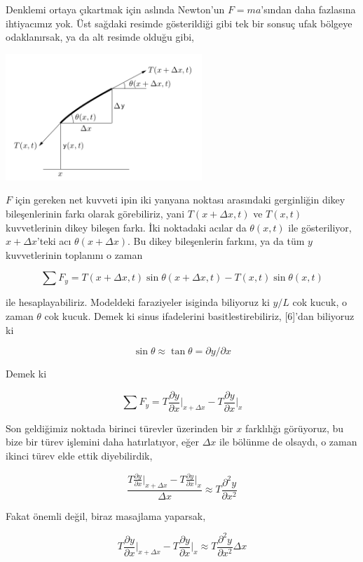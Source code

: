 \documentclass[12pt,fleqn]{article}\usepackage{../../common}
\begin{document}
Denklemi ortaya çıkartmak için aslında Newton'un $F=ma$'sından daha fazlasına
ihtiyacımız yok. Üst sağdaki resimde gösterildiği gibi tek bir sonsuç ufak
bölgeye odaklanırsak, ya da alt resimde olduğu gibi,

\includegraphics[width=20em]{compscieng_app17wave_02.png}

$F$ için gereken net kuvveti ipin iki yanyana noktası arasındaki gerginliğin
dikey bileşenlerinin farkı olarak görebiliriz, yani $T(x+\Delta x,t)$ ve
$T(x,t)$ kuvvetlerinin dikey bileşen farkı. İki noktadaki acılar da
$\theta(x,t)$ ile gösteriliyor, $x+\Delta x$'teki acı $\theta(x+\Delta x)$. Bu
dikey bileşenlerin farkını, ya da tüm $y$ kuvvetlerinin toplanını o zaman 

$$
\sum F_y = T(x+\Delta x,t) \sin\theta(x+\Delta x,t) - T(x,t) \sin\theta(x,t)
$$

ile hesaplayabiliriz. Modeldeki faraziyeler isiginda biliyoruz ki $y/L$ cok
kucuk, o zaman $\theta$ cok kucuk. Demek ki sinus ifadelerini
basitlestirebiliriz, [6]'dan biliyoruz ki

$$
\sin\theta \approx \tan\theta = \partial y / \partial x
$$

Demek ki

$$
\sum F_y =
T \frac{\partial y}{\partial x} \bigg\vert_{x+\Delta x} -
T \frac{\partial y}{\partial x} \bigg\vert_{x}
$$

Son geldiğimiz noktada birinci türevler üzerinden bir $x$ farklılığı görüyoruz,
bu bize bir türev işlemini daha hatırlatıyor, eğer $\Delta x$ ile bölünme de
olsaydı, o zaman ikinci türev elde ettik diyebilirdik,

$$
\frac{
T \frac{\partial y}{\partial x} \bigg\vert_{x+\Delta x} -
T \frac{\partial y}{\partial x} \bigg\vert_{x}
}{\Delta x} \approx T \frac{\partial^2 y}{\partial x^2}
$$

Fakat önemli değil, biraz masajlama yaparsak, 

$$
T \frac{\partial y}{\partial x} \bigg\vert_{x+\Delta x} -
T \frac{\partial y}{\partial x} \bigg\vert_{x} \approx
T \frac{\partial^2 y}{\partial x^2} \Delta x 
$$
\end{document}
